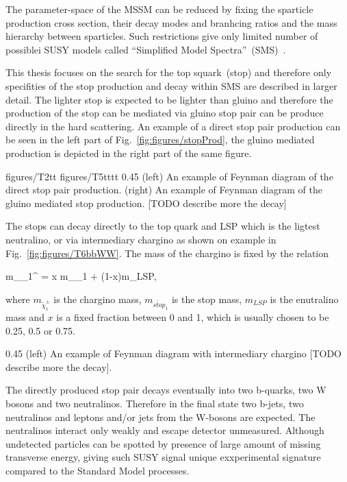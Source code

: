 The parameter-space of the MSSM can be reduced by fixing the sparticle production cross section, their decay modes and branhcing ratios and the mass hierarchy between sparticles. Such restrictions give only limited number of possiblei SUSY models called ``Simplified Model Spectra''~(SMS)~\cite{Alves:2011wf, Alwall:2008ag, Chatrchyan:2013sza}.

This thesis focuses on the search for the top squark~(stop) and therefore only specifities of the stop production and decay within SMS are described in larger detail. The lighter stop is expected to be lighter than gluino and therefore the production of the stop can be mediated via gluino stop pair can be produce directly in the hard scattering. An example of a direct stop pair production can be seen in the left part of Fig.~\ref{fig:figures/stopProd}, the gluino mediated production is depicted in the right part of the same figure.


                 {figures/T2tt}
                 {figures/T5tttt} %
                 {0.45}       %
                 {(left) An example of Feynman diagram of the direct stop pair production. (right)  An example of Feynman diagram of the gluino mediated stop production.  [TODO describe more the decay]  } %

The stops can decay directly to the top quark and LSP which is the ligtest neutralino, or via intermediary chargino as shown on example in Fig.~\ref{fig:figures/T6bbWW}. The mass of the chargino is fixed by the relation

{
m_{\tilde{\chi}_{1}^{\pm}} = x m_{_{1}} + (1-x)m_{LSP},
}

where $m_{\tilde{\chi}_{1}^{\pm}}$ is the chargino mass, $m_{\tilde{stop}_{1}}$ is the stop mass, $m_{LSP}$ is the enutralino mass and $x$ is a fixed fraction between 0 and 1, which is usually chosen to be 0.25, 0.5 or 0.75. 

                 {0.45}       %
                 {(left) An example of Feynman diagram with intermediary chargino [TODO describe more the decay].   } %

The directly produced stop pair decays eventually into two b-quarks, two W bosons and two neutralinos. Therefore in the final state two b-jets, two neutralinos and leptons and/or jets from the W-bosons are expected. The neutralinos interact only weakly and escape detector unmeasured. Although undetected particles can be spotted by presence of large amount of missing transverse energy, giving such SUSY signal unique exxperimental signature compared to the Standard Model processes.


